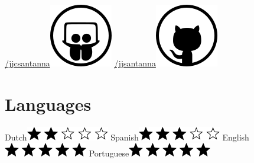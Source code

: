 \documentclass[print]{styles/friggeri-cv-mac} %
\begin{document}
\begin{aside}
\href{http://www.slideshare.net/jjcsantanna}{/jjcsantanna}\includegraphics[scale=0.3]{img/slideshare.png}
\href{https://github.com/jjsantanna}{/jjsantanna\includegraphics[scale=0.3]{img/github.png}}
~
\section{Languages}
Dutch\includegraphics[scale=0.40]{img/2stars.png}
Spanish\includegraphics[scale=0.40]{img/3stars.png}
English\includegraphics[scale=0.40]{img/5stars.png}
Portuguese\includegraphics[scale=0.40]{img/5stars.png}
\end{aside}
\end{document}
